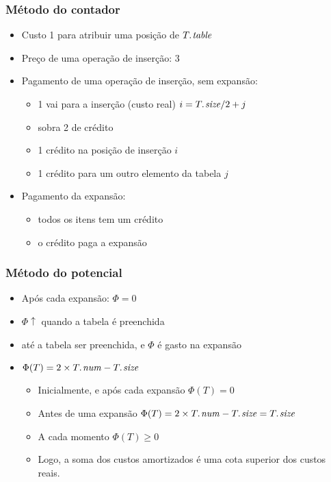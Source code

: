 \documentclass{beamer}
\begin{document}
\begin{frame}
\frametitle{Método do contador}
\begin{itemize}
\item Custo 1 para atribuir uma posição de $\attrib{T}{table}$
\item Preço de uma operação de inserção: 3
\item Pagamento de uma operação de inserção, sem expansão:
\begin{itemize}
\item 1 vai para a inserção (custo real) $i = \attrib{T}{size}/2 + j$
\item sobra 2 de crédito
\item 1 crédito na posição de inserção $i$
\item 1 crédito para um outro elemento da tabela $j$
\end{itemize}
\item Pagamento da expansão:
\begin{itemize}
\item todos os itens tem um crédito
\item o crédito paga a expansão
\end{itemize}
\end{itemize}

\end{frame}

\begin{frame}
\frametitle{Método do potencial}
\begin{itemize}
\item Após cada expansão: $\Phi = 0$
\item $\Phi \uparrow$ quando a tabela é preenchida
\item até a tabela ser preenchida, e $\Phi$ é gasto na expansão
\item $\Phi(T) = 2 \times \attrib{T}{num} - \attrib{T}{size}$
\begin{itemize}
\item Inicialmente, e após cada expansão $\Phi(T) = 0$
\item Antes de uma expansão $\Phi(T) = 2 \times \attrib{T}{num} - \attrib{T}{size} = \attrib{T}{size}$
\item A cada momento $\Phi(T) \ge 0$
\item Logo, a soma dos custos amortizados é uma cota superior dos custos reais.
\end{itemize}
\end{itemize}

\end{frame}
\end{document}
